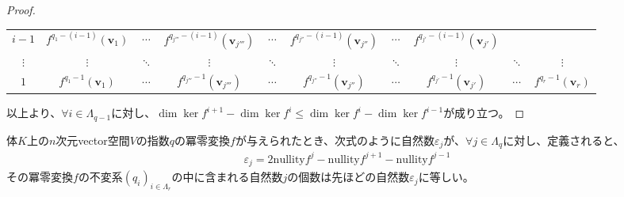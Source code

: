 \documentclass[dvipdfmx]{jsarticle}
\begin{document}
\begin{proof}
\begin{longtable}[c]{c|ccccccccc}
$i - 1$ & $f^{q_{1} - (i - 1)}\left( \mathbf{v}_{1} \right)$ & $\cdots$ & $f^{q_{j'''} - (i - 1)}\left( \mathbf{v}_{j'''} \right)$ & $\cdots$ & $f^{q_{j''} - (i - 1)}\left( \mathbf{v}_{j''} \right)$ & $\cdots$ & $f^{q_{j'} - (i - 1)}\left( \mathbf{v}_{j'} \right)$ & & \\
$\vdots$ & $\vdots$ & $\ddots$ & $\vdots$ & $\ddots$ & $\vdots$ & $\ddots$ & $\vdots$ & $\ddots$ & $\vdots$ \\
$1$ & $f^{q_{1} - 1}\left( \mathbf{v}_{1} \right)$ & $\cdots$ & $f^{q_{j'''} - 1}\left( \mathbf{v}_{j'''} \right)$ & $\cdots$ & $f^{q_{j''} - 1}\left( \mathbf{v}_{j''} \right)$ & $\cdots$ & $f^{q_{j'} - 1}\left( \mathbf{v}_{j'} \right)$ & $\cdots$ & $f^{q_{r} - 1}\left( \mathbf{v}_{r} \right)$ \\
\end{longtable}
以上より、$\forall i \in \varLambda_{q - 1}$に対し、$\dim{\ker f^{i + 1}} - \dim{\ker f^{i}} \leq \dim{\ker f^{i}} - \dim{\ker f^{i - 1}}$が成り立つ。
\end{proof}
\begin{thm}\label{2.2.5.5}
体$K$上の$n$次元vector空間$V$の指数$q$の冪零変換$f$が与えられたとき、次式のように自然数$\varepsilon_{j}$が、$\forall j \in \varLambda_{q}$に対し、定義されると、
\begin{align*}
\varepsilon_{j} = 2{\mathrm{nullity}}f^{j} - {\mathrm{nullity}}f^{j + 1} - {\mathrm{nullity}}f^{j - 1}
\end{align*}
その冪零変換$f$の不変系$\left( q_{i} \right)_{i \in \varLambda_{r}}$の中に含まれる自然数$j$の個数は先ほどの自然数$\varepsilon_{j}$に等しい。
\end{thm}
\end{document}
